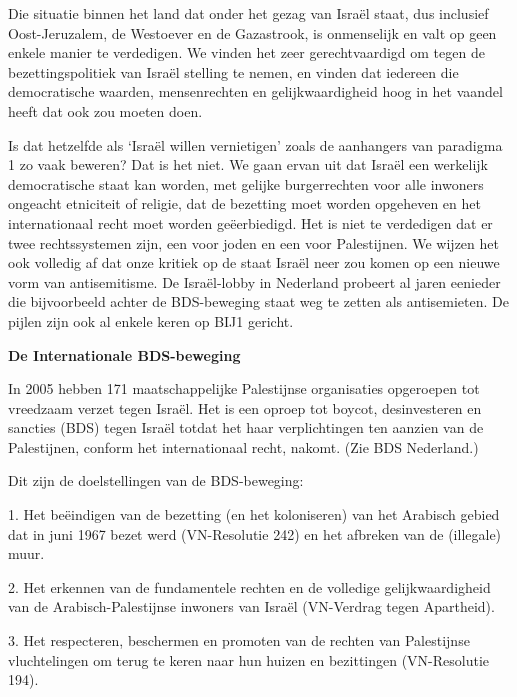 Die situatie binnen het land dat onder het gezag van Israël staat, dus
inclusief Oost-Jeruzalem, de Westoever en de Gazastrook, is onmenselijk
en valt op geen enkele manier te verdedigen. We vinden het zeer
gerechtvaardigd om tegen de bezettingspolitiek van Israël stelling te
nemen, en vinden dat iedereen die democratische waarden, mensenrechten
en gelijkwaardigheid hoog in het vaandel heeft dat ook zou moeten doen.

Is dat hetzelfde als `Israël willen vernietigen' zoals de aanhangers van
paradigma 1 zo vaak beweren? Dat is het niet. We gaan ervan uit dat
Israël een werkelijk democratische staat kan worden, met gelijke
burgerrechten voor alle inwoners ongeacht etniciteit of religie, dat de
bezetting moet worden opgeheven en het internationaal recht moet worden
geëerbiedigd. Het is niet te verdedigen dat er twee rechtssystemen zijn,
een voor joden en een voor Palestijnen. We wijzen het ook volledig af
dat onze kritiek op de staat Israël neer zou komen op een nieuwe vorm
van antisemitisme. De Israël-lobby in Nederland probeert al jaren
eenieder die bijvoorbeeld achter de BDS-beweging staat weg te zetten als
antisemieten. De pijlen zijn ook al enkele keren op BIJ1 gericht.

\textbf{De Internationale BDS-beweging}

In 2005 hebben 171 maatschappelijke Palestijnse organisaties opgeroepen
tot vreedzaam verzet tegen Israël. Het is een oproep tot boycot,
desinvesteren en sancties (BDS) tegen Israël totdat het haar
verplichtingen ten aanzien van de Palestijnen, conform het
internationaal recht, nakomt. (Zie BDS Nederland.)

Dit zijn de doelstellingen van de BDS-beweging:

1. Het beëindigen van de bezetting (en het koloniseren) van het Arabisch
gebied dat in juni 1967 bezet werd (VN-Resolutie 242) en het afbreken
van de (illegale) muur.

2. Het erkennen van de fundamentele rechten en de volledige
gelijkwaardigheid van de Arabisch-Palestijnse inwoners van Israël
(VN-Verdrag tegen Apartheid).

3. Het respecteren, beschermen en promoten van de rechten van
Palestijnse vluchtelingen om terug te keren naar hun huizen en
bezittingen (VN-Resolutie 194).

